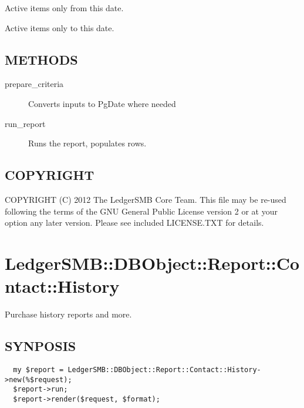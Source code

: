 \begin{description}
\begin{description}
\begin{description}
\begin{description}
\begin{description}
\begin{description}
\begin{description}
\begin{description}
\begin{description}
\begin{description}
\begin{description}
Active items only from this date.


\item[{active\_date\_to}] \mbox{}

Active items only to this date.

\end{description}
\subsection*{METHODS\label{LedgerSMB::DBObject::Report::Contact::Search_METHODS}}
\begin{description}

\item[{prepare\_criteria}] \mbox{}

Converts inputs to PgDate where needed


\item[{run\_report}] \mbox{}

Runs the report, populates rows.

\end{description}
\subsection*{COPYRIGHT\label{LedgerSMB::DBObject::Report::Contact::Search_COPYRIGHT}}


COPYRIGHT (C) 2012 The LedgerSMB Core Team.  This file may be re-used following
the terms of the GNU General Public License version 2 or at your option any
later version.  Please see included LICENSE.TXT for details.

\section{LedgerSMB::DBObject::Report::Contact::History\label{LedgerSMB::DBObject::Report::Contact::History}}


Purchase history reports
and more.

\subsection*{SYNPOSIS\label{LedgerSMB::DBObject::Report::Contact::History_SYNPOSIS}}
\begin{verbatim}
  my $report = LedgerSMB::DBObject::Report::Contact::History->new(%$request);
  $report->run;
  $report->render($request, $format);
\end{verbatim}

\end{description}
\end{description}
\end{description}
\end{description}
\end{description}
\end{description}
\end{description}
\end{description}
\end{description}
\end{description}
